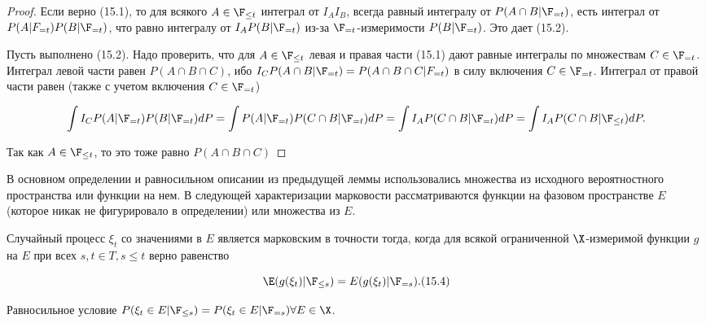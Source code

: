 \begin{proof}
    Если верно (15.1), то для всякого $A \in \F_{\leq t}$ интеграл от $I_AI_B$, всегда равный интегралу от $P(A \cap B|\F_{=t})$, есть интеграл от $P(A|F_{=t})P(B|\F_{=t})$, что равно интегралу от $I_A P(B|\F_{=t})$ из-за $\F_{=t}$-измеримости $P(B|\F_{=t})$. Это дает (15.2).
    
    Пусть выполнено (15.2). Надо проверить, что для $A \in \F_{\leq t}$ левая и правая части (15.1) дают равные интегралы по множествам $C \in \F_{=t}$. Интеграл левой части равен $P(A \cap B \cap C)$, ибо $I_C P(A \cap B|\F_{=t}) = P(A \cap B \cap C|F_{=t})$ в силу включения $C \in \F_{=t}$. Интеграл от правой части равен (также с учетом включения $C \in \F_{=t}$)

    \[ \int I_C P(A|\F_{=t})P(B|\F_{=t}) dP = \int P(A|\F_{=t})P(C \cap B|\F_{=t}) dP = \int I_A P(C \cap B|\F_{=t}) dP = \int I_A P(C \cap B|\F_{\leq t}) dP. \]

    Так как $A \in \F_{\leq t}$, то это тоже равно $P(A \cap B \cap C)$    
\end{proof}

В основном определении и равносильном описании из предыдущей леммы использовались множества из исходного вероятностного
пространства или функции на нем. В следующей характеризации марковости рассматриваются функции на фазовом пространстве $E$ (которое никак не фигурировало в определении) или множества из $E$.

\begin{theorem}
    Случайный процесс $\xi_t$ со значениями в $E$ является марковским в точности тогда, когда для всякой ограниченной $\X$-измеримой функции $g$ на $E$ при всех $s, t \in T, s \leq t$ верно равенство
    
    \[ \E(g(\xi_t)|\F_{\leq s}) = E(g(\xi_t)|\F_{=s}). (15.4) \]

    Равносильное условие $P(\xi_t \in E|\F_{\leq s}) = P(\xi_t \in E|\F_{=s}) \forall E \in \X$.
\end{theorem}

